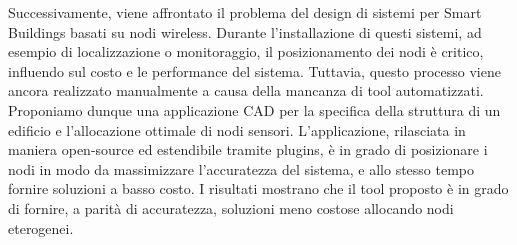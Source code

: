 Successivamente, viene affrontato il problema del design di sistemi per Smart Buildings basati su nodi wireless. Durante l'installazione di questi sistemi, ad esempio di localizzazione o monitoraggio, il posizionamento dei nodi è critico, influendo sul costo e le performance del sistema. Tuttavia, questo processo viene ancora realizzato manualmente a causa della mancanza di tool automatizzati.\\
Proponiamo dunque una applicazione CAD per la specifica della struttura di un edificio e l'allocazione ottimale di nodi sensori. L'applicazione, rilasciata in maniera open-source ed estendibile tramite plugins, è in grado di posizionare i nodi in modo da massimizzare l'accuratezza del sistema, e allo stesso tempo fornire soluzioni a basso costo.
I risultati mostrano che il tool proposto è in grado di fornire, a parità di accuratezza, soluzioni meno costose allocando nodi eterogenei.

%


